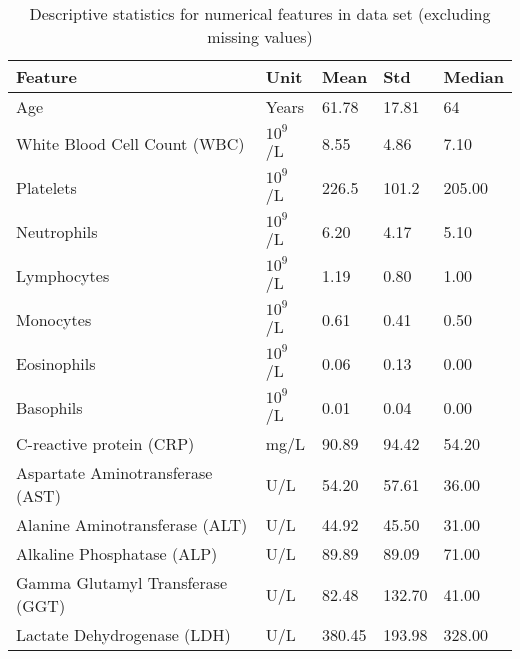 \begin{table}
\centering
\begin{tabular}{lllll}
Feature                          & Unit                    & Mean   & Std    & 
Median \\ \hline
Age                              & Years                   & 61.78  & 17.81  & 
64     \\
White Blood Cell Count (WBC)     & $10^9$/L & 8.55   & 4.86   & 
7.10   \\
Platelets                        & $10^9$/L & 226.5  & 101.2  & 
205.00 \\
Neutrophils                      & $10^9$/L & 6.20   & 4.17   & 
5.10   \\
Lymphocytes                      & $10^9$/L & 1.19   & 0.80   & 
1.00   \\
Monocytes                        & $10^9$/L & 0.61   & 0.41   & 
0.50   \\
Eosinophils                      & $10^9$/L & 0.06   & 0.13   & 
0.00   \\
Basophils                        & $10^9$/L & 0.01   & 0.04   & 
0.00   \\
C-reactive protein (CRP)         & mg/L                    & 90.89  & 94.42  & 
54.20  \\
Aspartate Aminotransferase (AST) & U/L                     & 54.20  & 57.61  & 
36.00  \\
Alanine Aminotransferase (ALT)   & U/L                     & 44.92  & 45.50  & 
31.00  \\
Alkaline Phosphatase (ALP)       & U/L                     & 89.89  & 89.09  & 
71.00  \\
Gamma Glutamyl Transferase (GGT) & U/L                     & 82.48  & 132.70 & 
41.00  \\
Lactate Dehydrogenase (LDH)      & U/L                     & 380.45 & 193.98 & 
328.00
\end{tabular}
\caption{Descriptive statistics for numerical features in data set (excluding 
missing values)}
\label{tab:feature-dist}
\end{table}



